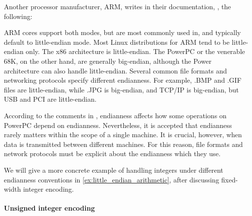 \begin{remark}
  Another processor manufacturer, ARM, writes in their documentation, \cite{ARMDocs:endianness}, the following:
  \begin{displayquote}
    ARM cores support both modes, but are most commonly used in, and typically default to little-endian mode. Most Linux distributions for ARM tend to be little-endian only. The x86 architecture is little-endian. The PowerPC or the venerable 68K, on the other hand, are generally big-endian, although the Power architecture can also handle little-endian. Several common file formats and networking protocols specify different endianness. For example, .BMP and .GIF files are little-endian, while .JPG is big-endian, and TCP/IP is big-endian, but USB and PCI are little-endian.
  \end{displayquote}

  According to the comments in \cite{SO:bit_shift_endianness}, endianness affects how some operations on PowerPC depend on endianness. Nevertheless, it is accepted that endianness rarely matters within the scope of a single machine. It is crucial, however, when data is transmitted between different machines. For this reason, file formats and network protocols must be explicit about the endianness which they use.

  We will give a more concrete example of handling integers under different endianness conventions in \cref{ex:little_endian_arithmetic}, after discussing fixed-width integer encoding.
\end{remark}

\paragraph{Unsigned integer encoding}

